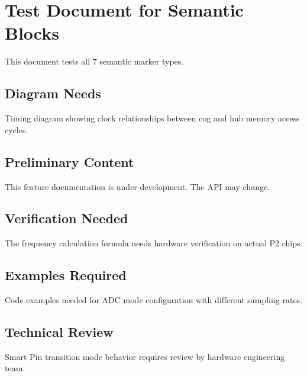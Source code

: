 \section{Test Document for Semantic Blocks}

This document tests all 7 semantic marker types.

\subsection{Diagram Needs}

\begin{needsdiagram}
Timing diagram showing clock relationships between cog and hub memory access cycles.
\end{needsdiagram}

\subsection{Preliminary Content}

\begin{preliminarycontent}
This feature documentation is under development. The API may change.
\end{preliminarycontent}

\subsection{Verification Needed}

\begin{needsverification}
The frequency calculation formula needs hardware verification on actual P2 chips.
\end{needsverification}

\subsection{Examples Required}

\begin{needsexamples}
Code examples needed for ADC mode configuration with different sampling rates.
\end{needsexamples}

\subsection{Technical Review}

\begin{needstechreview}
Smart Pin transition mode behavior requires review by hardware engineering team.
\end{needstechreview}

